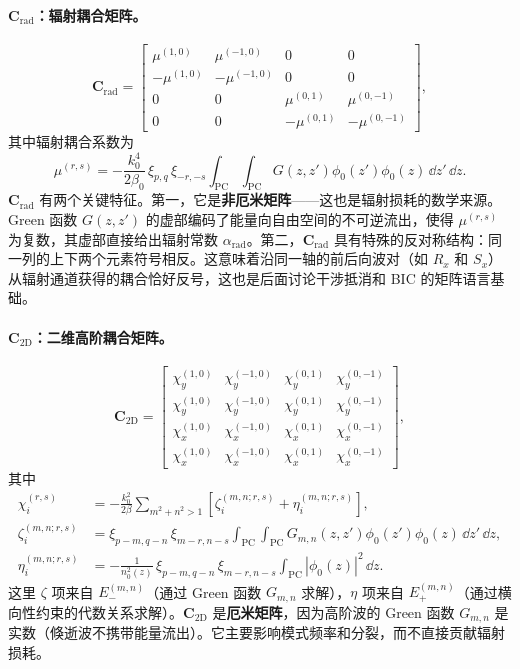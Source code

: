 \paragraph{$\bm{C}_{\mathrm{rad}}$：辐射耦合矩阵。}
\begin{equation}
\bm{C}_{\mathrm{rad}} =
\begin{bmatrix}
\mu^{(1,0)} & \mu^{(-1,0)} & 0 & 0\\
-\mu^{(1,0)} & -\mu^{(-1,0)} & 0 & 0\\
0 & 0 & \mu^{(0,1)} & \mu^{(0,-1)}\\
0 & 0 & -\mu^{(0,1)} & -\mu^{(0,-1)}
\end{bmatrix},
\label{eq:3d_cwt_Crad_matrix}
\end{equation}
其中辐射耦合系数为
\begin{equation}
\mu^{(r,s)} = -\frac{k_0^4}{2\beta_0}\,\xi_{p,q}\,\xi_{-r,-s}\int_{\mathrm{PC}}\!\!\int_{\mathrm{PC}} G(z,z')\phi_0(z')\phi_0(z)\,\dd z'\,\dd z.
\label{eq:3d_cwt_Crad_element}
\end{equation}
$\bm{C}_{\mathrm{rad}}$ 有两个关键特征。第一，它是\textbf{非厄米矩阵}——这也是辐射损耗的数学来源。Green 函数 $G(z,z')$ 的虚部编码了能量向自由空间的不可逆流出，使得 $\mu^{(r,s)}$ 为复数，其虚部直接给出辐射常数 $\alpha_{\mathrm{rad}}$。第二，$\bm{C}_{\mathrm{rad}}$ 具有特殊的反对称结构：同一列的上下两个元素符号相反。这意味着沿同一轴的前后向波对（如 $R_x$ 和 $S_x$）从辐射通道获得的耦合恰好反号，这也是后面讨论干涉抵消和 BIC 的矩阵语言基础。

\paragraph{$\bm{C}_{\mathrm{2D}}$：二维高阶耦合矩阵。}
\begin{equation}
\bm{C}_{\mathrm{2D}} =
\begin{bmatrix}
\chi_y^{(1,0)} & \chi_y^{(-1,0)} & \chi_y^{(0,1)} & \chi_y^{(0,-1)}\\
\chi_y^{(1,0)} & \chi_y^{(-1,0)} & \chi_y^{(0,1)} & \chi_y^{(0,-1)}\\
\chi_x^{(1,0)} & \chi_x^{(-1,0)} & \chi_x^{(0,1)} & \chi_x^{(0,-1)}\\
\chi_x^{(1,0)} & \chi_x^{(-1,0)} & \chi_x^{(0,1)} & \chi_x^{(0,-1)}
\end{bmatrix},
\label{eq:3d_cwt_C2D_matrix}
\end{equation}
其中
\begin{align}
\chi_i^{(r,s)} &= -\frac{k_0^2}{2\beta}\sum_{m^2+n^2>1}\left[\zeta_i^{(m,n;r,s)} + \eta_i^{(m,n;r,s)}\right],
\label{eq:3d_cwt_C2D_element}\\
\zeta_i^{(m,n;r,s)} &= \xi_{p-m,q-n}\,\xi_{m-r,n-s}\int_{\mathrm{PC}}\!\!\int_{\mathrm{PC}} G_{m,n}(z,z')\phi_0(z')\phi_0(z)\,\dd z'\,\dd z,
\label{eq:3d_cwt_zeta}\\
\eta_i^{(m,n;r,s)} &= -\frac{1}{n_0^2(z)}\,\xi_{p-m,q-n}\,\xi_{m-r,n-s}\int_{\mathrm{PC}} |\phi_0(z)|^2\,\dd z.
\label{eq:3d_cwt_eta}
\end{align}
这里 $\zeta$ 项来自 $E_-^{(m,n)}$（通过 Green 函数 $G_{m,n}$ 求解），$\eta$ 项来自 $E_+^{(m,n)}$（通过横向性约束的代数关系求解）。$\bm{C}_{\mathrm{2D}}$ 是\textbf{厄米矩阵}，因为高阶波的 Green 函数 $G_{m,n}$ 是实数（倏逝波不携带能量流出）。它主要影响模式频率和分裂，而不直接贡献辐射损耗。


